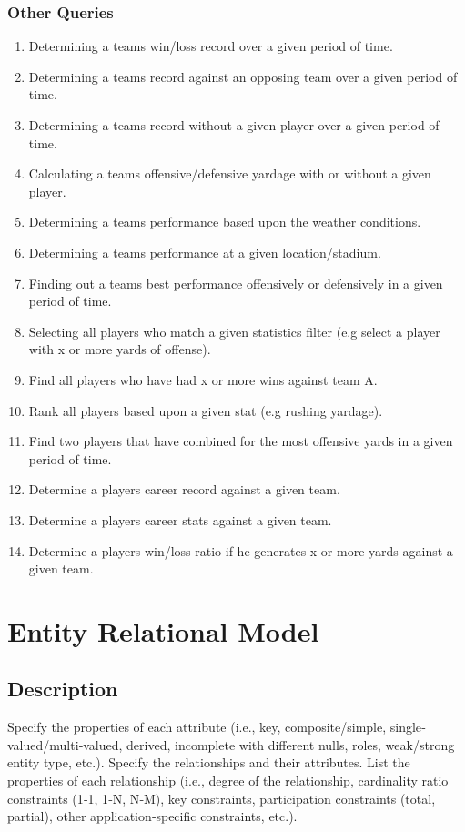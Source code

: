 \documentclass[12pt,letterpaper]{article}
\begin{document}
\subsubsection{Other Queries}

\begin{enumerate}
\item Determining a teams win/loss record over a given period of time.
\item Determining a teams record against an opposing team over a given period of time.
\item Determining a teams record without a given player over a given period of time.
\item Calculating a teams offensive/defensive yardage with or without a given player.
\item Determining a teams performance based upon the weather conditions.
\item Determining a teams performance at a given location/stadium.
\item Finding out a teams best performance offensively or defensively in a given period of time.
\item Selecting all players who match a given statistics filter (e.g select a player with x or more yards of offense).
\item Find all players who have had x or more wins against team A.
\item Rank all players based upon a given stat (e.g rushing yardage).
\item Find two players that have combined for the most offensive yards in a given period of time.
\item Determine a players career record against a given team.
\item Determine a players career stats against a given team.
\item Determine a players win/loss ratio if he generates x or more yards against a given team.
\end{enumerate}

\clearpage\null

\section{Entity Relational Model}
\subsection{Description}
Specify the properties of each attribute (i.e., key, composite/simple, single‐valued/multi‐valued, derived, incomplete with different nulls, roles, weak/strong entity type, etc.). Specify the relationships and their attributes. List the properties of each relationship (i.e., degree of the relationship, cardinality ratio constraints (1‐1, 1‐N, N‐M), key constraints, participation constraints (total, partial), other application‐specific constraints, etc.).
\end{document}
